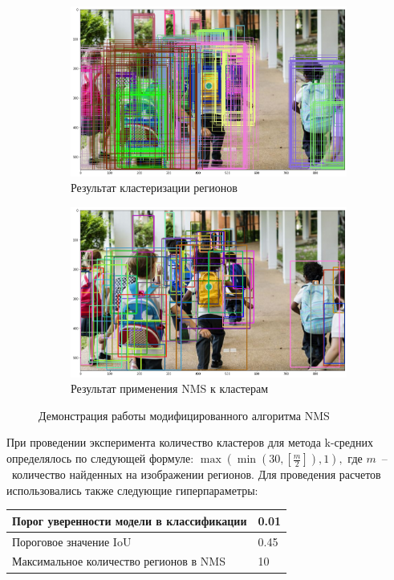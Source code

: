 \documentclass[a4paper,14pt]{article}
\begin{document}
    \begin{figure}[H]
    	\centering
    	\begin{subfigure}{.5\textwidth}
    		\centering
    		\includegraphics[width=\linewidth]{images/before_nms}
    		\caption{Результат кластеризации регионов}
    		\label{fig:nms1}
    	\end{subfigure}%
    	\begin{subfigure}{.5\textwidth}
    		\centering
    		\includegraphics[width=\linewidth]{images/after_nms}
    		\caption{Результат применения NMS к кластерам}
    		\label{fig:nms2}
    	\end{subfigure}
    	\caption{Демонстрация работы модифицированного алгоритма NMS}
    	\label{fig:nms}
    \end{figure}
    
    При проведении эксперимента количество кластеров для метода k-средних определялось по следующей формуле:
    $\max(\min(30, \left[\frac{m}{2}\right]), 1),$ где $m$~--~количество найденных на изображении регионов. 
    Для проведения расчетов использовались также следующие гиперпараметры:
    \begin{center}
    	\begin{tabular}{| l | l |}
    		\hline
    		Порог уверенности модели в классификации & 0.01\\ \hline
    		Пороговое значение IoU & 0.45 \\ \hline
    		Максимальное количество регионов в NMS  & 10\\
    		\hline
    	\end{tabular}
    \end{center}
\end{document}
